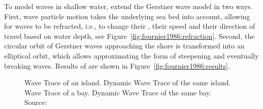 To model waves in shallow water, \citet{Fournier:1986} extend the Gerstner
wave model in two ways. First, wave particle motion takes the underlying sea
bed into account, allowing for waves to be refracted, i.e., to change their \wavelength,
their speed and their direction of travel based on water depth, see Figure~\ref{fig:fournier1986:refraction}.
Second, the circular orbit of Gerstner waves approaching the shore is
transformed into an elliptical orbit, which allows approximating the form of
steepening and eventually breaking waves.
Results of \citeauthor{Fournier:1986} are shown in Figure~\ref{fig:fournier1986:results}.
%
\begin{figure}
 \centering
 \hfill
 \hfill
 \hfill
 \caption[Wave Trace by~\citet{Gonzato:1997}.]{
  Wave Trace of an island.
  Dynamic Wave Trace of the same island.
  Wave Trace of a bay.
  Dynamic Wave Trace of the same bay.
 Source:~\citet{Gonzato:1997}
 }
 \label{fig:gonzato1997:results}
\end{figure}
%

